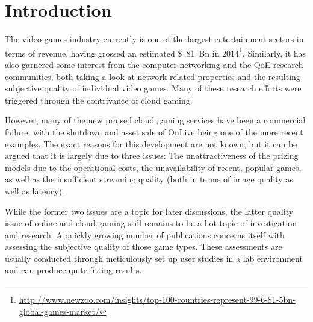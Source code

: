 \section{Introduction}
\label{sec:introduction}

The video games industry currently is one of the largest entertainment sectors in terms of revenue, having grossed an estimated \SI{81}[\$]{Bn} in 2014\footnote{\url{http://www.newzoo.com/insights/top-100-countries-represent-99-6-81-5bn-global-games-market/}}. Similarly, it has also garnered some interest from the computer networking and the \gls{QoE} research communities, both taking a look at network-related properties and the resulting subjective quality of individual video games. Many of these research efforts were triggered through the contrivance of cloud gaming.


However, many of the new praised cloud gaming services have been a commercial failure, with the shutdown and asset sale of OnLive being one of the more recent examples. The exact reasons for this development are not known, but it can be argued that it is largely due to three issues: The unattractiveness of the prizing models due to the operational costs, the unavailability of recent, popular games, as well as the insufficient streaming quality (both in terms of image quality as well as latency).

While the former two issues are a topic for later discussions, the latter quality issue of online and cloud gaming still remains to be a hot topic of investigation and research. %
A quickly growing number of publications concerns itself with assessing the subjective quality of those game types. These assessments are usually conducted through meticulously set up user studies in a lab environment and can produce quite fitting results.


